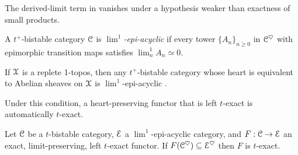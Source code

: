 The derived-limit term in  vanishes under a hypothesis weaker than exactness of small products.
\begin{definition}\label{def: lim1 acyclic categories}
    A $t^{+}$-bistable category $\EuScript{C}$ is \emph{$\lim^{1}$-epi-acyclic} if every tower $\{A_{n}\}_{n\geq0}$ in $\EuScript{C}^{\heartsuit}$ with epimorphic transition maps satisfies $\lim^{1}_{n}A_{n}\simeq0$. 
\end{definition}
\begin{remark}\label{rmk: 1-localic is lim1 epi acyclic}
    If $\EuScript{X}$ is a replete 1-topos, then any $t^{+}$-bistable category whose heart is equivalent to Abelian sheaves on $\EuScript{X}$ is $\lim^{1}$-epi-acyclic \cite[Prop. 3.1.10]{Proetale}. 
\end{remark}
Under this condition, a heart-preserving functor that is left $t$-exact is automatically $t$-exact.
\begin{proposition}\label{prop: lim1 acyclic t-exact}
    Let $\EuScript{C}$ be a $t$-bistable category, $\EuScript{E}$ a $\lim^{1}$-epi-acyclic category, and $F:\EuScript{C}\to\EuScript{E}$ an exact, limit-preserving, left $t$-exact functor. If $F(\EuScript{C}^{\heartsuit})\subseteq\EuScript{E}^{\heartsuit}$ then $F$ is $t$-exact. 
\end{proposition}
